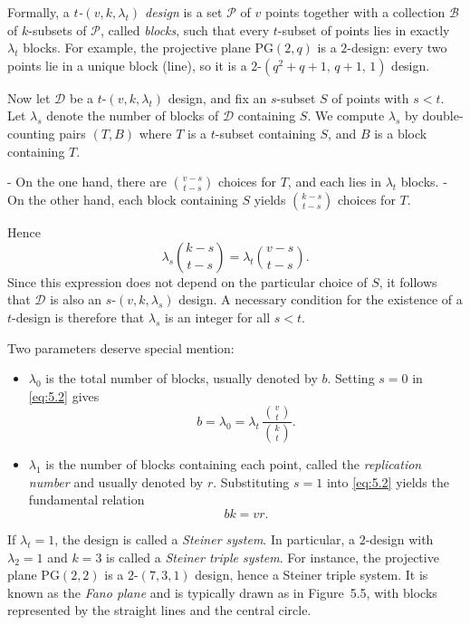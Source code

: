\documentclass[12pt,a4paper,openany]{book}
\begin{document}
Formally, a \emph{$t$-$(v,k,\lambda_t)$ design} is a set $\mathcal{P}$ of $v$ points together with a collection $\mathcal{B}$ of $k$-subsets of $\mathcal{P}$, called \emph{blocks}, such that every $t$-subset of points lies in exactly $\lambda_t$ blocks. 
For example, the projective plane $\mathrm{PG}(2,q)$ is a $2$-design: every two points lie in a unique block (line), so it is a $2$-$(q^2+q+1,\,q+1,\,1)$ design.

Now let $\mathcal{D}$ be a $t$-$(v,k,\lambda_t)$ design, and fix an $s$-subset $S$ of points with $s < t$. 
Let $\lambda_s$ denote the number of blocks of $\mathcal{D}$ containing $S$. 
We compute $\lambda_s$ by double-counting pairs $(T,B)$ where $T$ is a $t$-subset containing $S$, and $B$ is a block containing $T$.  

- On the one hand, there are $\binom{v-s}{t-s}$ choices for $T$, and each lies in $\lambda_t$ blocks.  
- On the other hand, each block containing $S$ yields $\binom{k-s}{t-s}$ choices for $T$.  

Hence
\begin{equation}\label{eq:5.2}
\lambda_s \binom{k-s}{t-s} = \lambda_t \binom{v-s}{t-s}.
\end{equation}
Since this expression does not depend on the particular choice of $S$, it follows that $\mathcal{D}$ is also an $s$-$(v,k,\lambda_s)$ design. 
A necessary condition for the existence of a $t$-design is therefore that $\lambda_s$ is an integer for all $s<t$.

Two parameters deserve special mention:
\begin{itemize}
    \item $\lambda_0$ is the total number of blocks, usually denoted by $b$.  
    Setting $s=0$ in \eqref{eq:5.2} gives
    \[
    b = \lambda_0 = \lambda_t \,\frac{\binom{v}{t}}{\binom{k}{t}}.
    \]
    \item $\lambda_1$ is the number of blocks containing each point, called the \emph{replication number} and usually denoted by $r$.  
    Substituting $s=1$ into \eqref{eq:5.2} yields the fundamental relation
    \[
    bk = vr.
    \]
\end{itemize}

If $\lambda_t = 1$, the design is called a \emph{Steiner system}.  
In particular, a $2$-design with $\lambda_2 = 1$ and $k=3$ is called a \emph{Steiner triple system}.  
For instance, the projective plane $\mathrm{PG}(2,2)$ is a $2$-$(7,3,1)$ design, hence a Steiner triple system.  
It is known as the \emph{Fano plane} and is typically drawn as in Figure~5.5, with blocks represented by the straight lines and the central circle.
\end{document}
